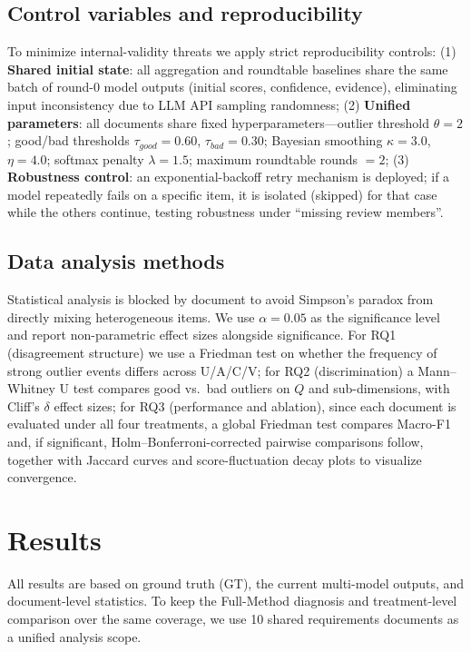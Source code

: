 \documentclass[sn-mathphys-num]{sn-jnl}
\begin{document}
\subsection{Control variables and reproducibility}
To minimize internal-validity threats we apply strict reproducibility controls: (1) \textbf{Shared initial state}: all aggregation and roundtable baselines share the same batch of round-0 model outputs (initial scores, confidence, evidence), eliminating input inconsistency due to LLM API sampling randomness; (2) \textbf{Unified parameters}: all documents share fixed hyperparameters---outlier threshold $\theta=2$; good/bad thresholds $\tau_{good}=0.60$, $\tau_{bad}=0.30$; Bayesian smoothing $\kappa=3.0$, $\eta=4.0$; softmax penalty $\lambda=1.5$; maximum roundtable rounds $=2$; (3) \textbf{Robustness control}: an exponential-backoff retry mechanism is deployed; if a model repeatedly fails on a specific item, it is isolated (skipped) for that case while the others continue, testing robustness under ``missing review members''.

\subsection{Data analysis methods}\label{sec:analysis}
Statistical analysis is blocked by document to avoid Simpson's paradox from directly mixing heterogeneous items. We use $\alpha=0.05$ as the significance level and report non-parametric effect sizes alongside significance. For RQ1 (disagreement structure) we use a Friedman test on whether the frequency of strong outlier events differs across U/A/C/V; for RQ2 (discrimination) a Mann--Whitney U test compares good vs.\ bad outliers on $Q$ and sub-dimensions, with Cliff's $\delta$ effect sizes; for RQ3 (performance and ablation), since each document is evaluated under all four treatments, a global Friedman test compares Macro-F1 and, if significant, Holm--Bonferroni-corrected pairwise comparisons follow, together with Jaccard curves and score-fluctuation decay plots to visualize convergence.

\section{Results}\label{sec:results}
All results are based on ground truth (GT), the current multi-model outputs, and document-level statistics. To keep the Full-Method diagnosis and treatment-level comparison over the same coverage, we use 10 shared requirements documents as a unified analysis scope.
\end{document}
